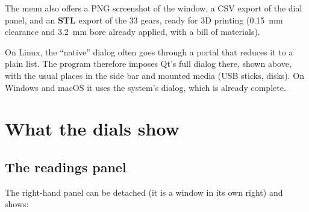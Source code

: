 The  menu also offers a PNG screenshot of the window, a CSV export of the dial
panel, and an \textbf{STL} export of the 33 gears, ready for 3D printing (0.15~mm clearance and
3.2~mm bore already applied, with a bill of materials).


\begin{astuce}
On Linux, the “native” dialog often goes through a portal that reduces it to a plain list.
The program therefore imposes Qt's full dialog there, shown above, with the usual places in
the side bar and mounted media (USB sticks, disks). On Windows and macOS it uses the system's
dialog, which is already complete.
\end{astuce}

\section{What the dials show}

\subsection{The readings panel}

The right-hand panel can be detached (it is a window in its own right) and shows:

